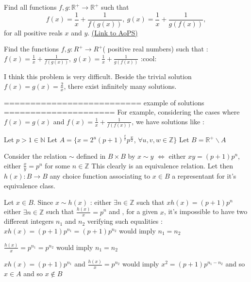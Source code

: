 \begin{problem}
	Find all functions $f,g: \mathbb R^{+} \to \mathbb R^{+}$ such that
\[ f(x)=\frac 1x + \frac 1{f(g(x))},\ g(x)=\frac 1x + \frac 1{g(f(x))},\]
for all positive reals $x$ and $y$.
	\flushright \href{https://artofproblemsolving.com/community/c6h310814}{(Link to AoPS)}
\end{problem}



\begin{solution}
	\begin{tcolorbox}Find the functions $ f,g: R^ + \rightarrow R^ +$( positive real numbers) such that :
$ f(x) = \frac 1x + \frac 1{f(g(x))},\ g(x) = \frac 1x + \frac 1{g(f(x))}$
 :cool:\end{tcolorbox}

I think this problem is very difficult.
Beside the trivial solution $ f(x) = g(x) = \frac 2x$, there exist infinitely many solutions.

==========================  example of solutions =====================
For example, considering the cases where $ f(x) = g(x)$ and $ f(x) = \frac 1x + \frac 1{f(f(x))}$, we have solutions like :

Let $ p > 1\in\mathbb N$
Let $ A = \{x = 2^u(p + 1)^{\frac v2}p^{\frac w2}$, $ \forall u,v,w\in\mathbb Z\}$
Let $ B = \mathbb R^ + \backslash A$

Consider the relation $ \sim$ defined in $ B\times B$ by $ x\sim y$ $ \iff$ either $ xy = (p + 1)p^n$, either $ \frac xy = p^n$ for some $ n\in\mathbb Z$
This clearly is an equivalence relation.
Let then $ h(x): B\to B$ any choice function associating to $ x\in B$ a representant for it's equivalence class.

Let $ x\in B$. Since $ x\sim h(x)$ :
either $ \exists n\in\mathbb Z$ such that $ xh(x) = (p + 1)p^n$
either $ \exists n\in\mathbb Z$ such that $ \frac {h(x)}x = p^n$
and , for a given $ x$, it's impossible to have two different integers $ n_1$ and $ n_2$ verifying such equalities :
$ xh(x) = (p + 1)p^{n_1} = (p + 1)p^{n_2}$ would imply $ n_1 = n_2$

$ \frac {h(x)}x = p^{n_1} = p^{n_2}$ would imply $ n_1 = n_2$

$ xh(x) = (p + 1)p^{n_1}$ and $ \frac {h(x)}x = p^{n_2}$ would imply $ x^2 = (p + 1)p^{n_1 - n_2}$ and so $ x\in A$ and so $ x\notin B$


\end{solution}
